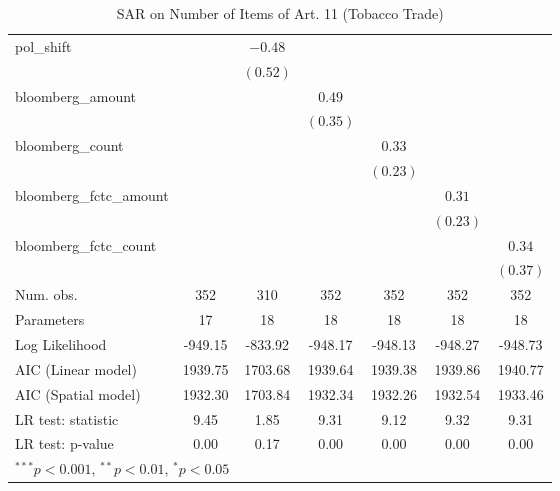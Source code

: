 \begin{table}[!h]
\begin{center}
\begin{tabular}{l c c c c c c }
pol\_shift              &              & $-0.48$      &              &              &              &              \\
                        &              & $(0.52)$     &              &              &              &              \\
bloomberg\_amount       &              &              & $0.49$       &              &              &              \\
                        &              &              & $(0.35)$     &              &              &              \\
bloomberg\_count        &              &              &              & $0.33$       &              &              \\
                        &              &              &              & $(0.23)$     &              &              \\
bloomberg\_fctc\_amount &              &              &              &              & $0.31$       &              \\
                        &              &              &              &              & $(0.23)$     &              \\
bloomberg\_fctc\_count  &              &              &              &              &              & $0.34$       \\
                        &              &              &              &              &              & $(0.37)$     \\
\midrule
Num. obs.               & 352          & 310          & 352          & 352          & 352          & 352          \\
Parameters              & 17           & 18           & 18           & 18           & 18           & 18           \\
Log Likelihood          & -949.15      & -833.92      & -948.17      & -948.13      & -948.27      & -948.73      \\
AIC (Linear model)      & 1939.75      & 1703.68      & 1939.64      & 1939.38      & 1939.86      & 1940.77      \\
AIC (Spatial model)     & 1932.30      & 1703.84      & 1932.34      & 1932.26      & 1932.54      & 1933.46      \\
LR test: statistic      & 9.45         & 1.85         & 9.31         & 9.12         & 9.32         & 9.31         \\
LR test: p-value        & 0.00         & 0.17         & 0.00         & 0.00         & 0.00         & 0.00         \\
\bottomrule
\multicolumn{7}{l}{\scriptsize{$^{***}p<0.001$, $^{**}p<0.01$, $^*p<0.05$}}
\end{tabular}
\caption{SAR on Number of Items of Art. 11 (Tobacco Trade)}
\label{table:coefficients}
\end{center}
\end{table}
